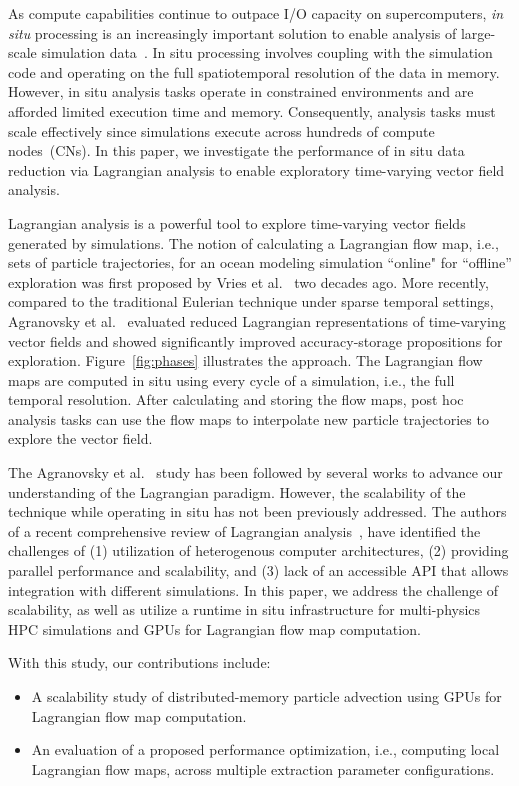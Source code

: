 As compute capabilities continue to outpace I/O capacity on supercomputers, \textit{in situ} processing is an increasingly important solution to enable analysis of large-scale simulation data~\cite{bauer2016situ}.
%
In situ processing involves coupling with the simulation code and operating on the full spatiotemporal resolution of the data in memory. 
%
However, in situ analysis tasks operate in constrained environments and are afforded limited execution time and memory.
%
Consequently, analysis tasks must scale effectively since simulations execute across hundreds of compute nodes~(CNs).
%
In this paper, we investigate the performance of in situ data reduction via Lagrangian analysis to enable exploratory time-varying vector field analysis.
%


Lagrangian analysis is a powerful tool to explore time-varying vector fields generated by simulations.
%
The notion of calculating a Lagrangian flow map, i.e., sets of particle trajectories, for an ocean modeling simulation ``online" for ``offline'' exploration was first proposed by Vries et al.~\cite{vries2001calculating} two decades ago.
%
More recently, compared to the traditional Eulerian technique under sparse temporal settings, Agranovsky et al.~\cite{agranovsky2014improved} evaluated reduced Lagrangian representations of time-varying vector fields and showed significantly improved accuracy-storage propositions for exploration. 
%
Figure~\ref{fig:phases} illustrates the approach.
%
The Lagrangian flow maps are computed in situ using every cycle of a simulation, i.e., the full temporal resolution.
%
After calculating and storing the flow maps, post hoc analysis tasks can use the flow maps to interpolate new particle trajectories to explore the vector field.
%
%

%
The Agranovsky et al.~\cite{agranovsky2014improved} study has been followed by several works to advance our understanding of the Lagrangian paradigm. 
%
However, the scalability of the technique while operating in situ has not been previously addressed.
%
The authors of a recent comprehensive review of Lagrangian analysis~\cite{VANSEBILLE201849}, have identified the challenges of (1) utilization of heterogenous computer architectures, (2) providing parallel performance and scalability, and (3) lack of an accessible API that allows integration with different simulations. 
%
In this paper, we address the challenge of scalability, as well as utilize a runtime in situ infrastructure for multi-physics HPC simulations and GPUs for Lagrangian flow map computation. 
%

With this study, our contributions include:
\vspace{-1mm}
\begin{itemize}[leftmargin=*,noitemsep,topsep=0pt,parsep=0pt,partopsep=0pt]
\item A scalability study of distributed-memory particle advection using GPUs for Lagrangian flow map computation. 
\item An evaluation of a proposed performance optimization, i.e., computing local Lagrangian flow maps, across multiple extraction parameter configurations.
\vspace{-1mm}
\end{itemize}

